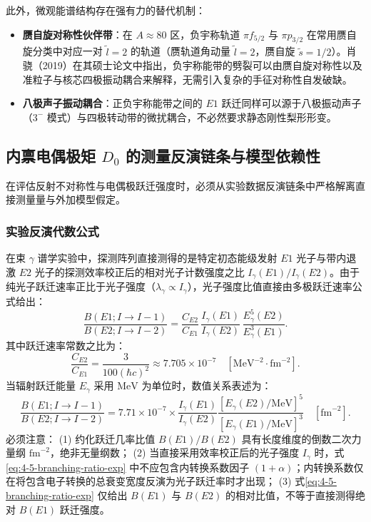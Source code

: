 此外，微观能谱结构存在强有力的替代机制：
\begin{itemize}
\item \textbf{赝自旋对称性伙伴带}：在 $A\approx 80$ 区，负宇称轨道 $\pi f_{5/2}$ 与 $\pi p_{3/2}$ 在常用赝自旋分类中对应一对 $\tilde l=2$ 的轨道（赝轨道角动量 $\tilde{l}=2$，赝自旋 $\tilde{s}=1/2$）。肖骁（2019）在其硕士论文中指出，负宇称能带的劈裂可以由赝自旋对称性以及准粒子与核芯四极振动耦合来解释，无需引入复杂的手征对称性自发破缺。
\item \textbf{八极声子振动耦合}：正负宇称能带之间的 $E1$ 跃迁同样可以源于八极振动声子（$3^-$ 模式）与四极转动带的微扰耦合，不必然要求静态刚性梨形形变。
\end{itemize}

\subsection{内禀电偶极矩 $D_0$ 的测量反演链条与模型依赖性}\label{sec:4-5-5}

在评估反射不对称性与电偶极跃迁强度时，必须从实验数据反演链条中严格解离直接测量量与外加模型假定。

\subsubsection{实验反演代数公式}

在束 $\gamma$ 谱学实验中，探测阵列直接测得的是特定初态能级发射 $E1$ 光子与带内退激 $E2$ 光子的探测效率校正后的相对光子计数强度之比 $I_\gamma(E1)/I_\gamma(E2)$。由于纯光子跃迁速率正比于光子强度（$\lambda_\gamma \propto I_\gamma$），光子强度比值直接由多极跃迁速率公式给出：
\begin{equation}\label{eq:4-5-branching-ratio-exp}
\frac{B(E1; I \to I-1)}{B(E2; I \to I-2)} = \frac{C_{E2}}{C_{E1}} \, \frac{I_\gamma(E1)}{I_\gamma(E2)} \, \frac{E_\gamma^5(E2)}{E_\gamma^3(E1)} .
\end{equation}
其中跃迁速率常数之比为：
\begin{equation}\label{eq:4-5-rate-constant-ratio}
\frac{C_{E2}}{C_{E1}} = \frac{3}{100 (\hbar c)^2} \approx 7.705 \times 10^{-7} \quad [\mathrm{MeV}^{-2} \cdot \mathrm{fm}^{-2}] .
\end{equation}
当辐射跃迁能量 $E_\gamma$ 采用 $\mathrm{MeV}$ 为单位时，数值关系表述为：
\begin{equation}\label{eq:4-5-ratio-mev}
\frac{B(E1; I \to I-1)}{B(E2; I \to I-2)} = 7.71 \times 10^{-7} \times \frac{I_\gamma(E1)}{I_\gamma(E2)} \frac{[E_\gamma(E2)/\mathrm{MeV}]^5}{[E_\gamma(E1)/\mathrm{MeV}]^3} \quad [\mathrm{fm}^{-2}] .
\end{equation}
必须注意：
(1) 约化跃迁几率比值 $B(E1)/B(E2)$ 具有长度维度的倒数二次力量纲 $\mathrm{fm}^{-2}$，绝非无量纲数；
(2) 当直接采用效率校正后的光子强度 $I_\gamma$ 时，式\eqref{eq:4-5-branching-ratio-exp} 中不应包含内转换系数因子 $(1+\alpha)$；内转换系数仅在将包含电子转换的总衰变宽度反演为光子跃迁率时才出现；
(3) 式\eqref{eq:4-5-branching-ratio-exp} 仅给出 $B(E1)$ 与 $B(E2)$ 的相对比值，不等于直接测得绝对 $B(E1)$ 跃迁强度。

